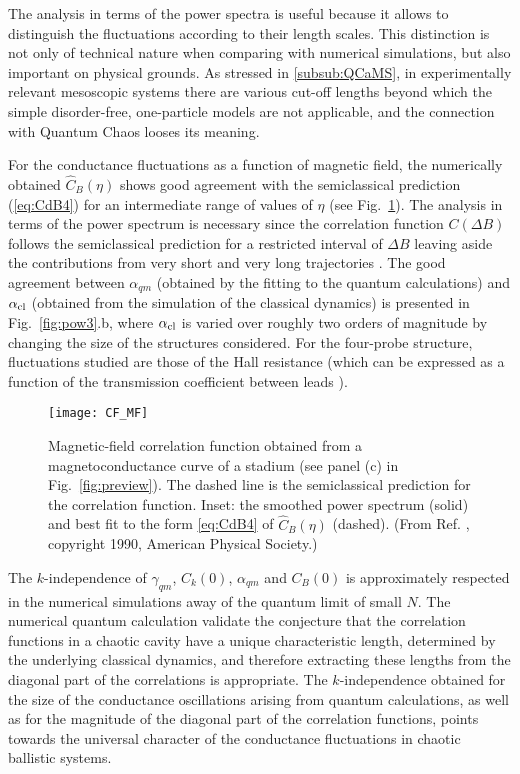 \documentclass[a4paper,10pt]{article}
\newcommand{\nin}{\noindent}
\newcommand{\alc}{\alpha_{\rm cl}}
\begin{document}
\nin The analysis in terms of the power spectra is useful because it allows to distinguish the fluctuations according to their length scales. This distinction is not only of technical nature when comparing with numerical simulations, but also important on physical grounds. As stressed in \ref{subsub:QCaMS}, in experimentally relevant mesoscopic systems there are various cut-off lengths beyond which the simple disorder-free, one-particle models are not applicable, and the connection with Quantum Chaos looses its meaning. 

\nin For the conductance fluctuations as a function of magnetic field, the numerically obtained $\widehat{C}_B(\eta)$ shows good agreement with the semiclassical prediction (\ref{eq:CdB4}) for an intermediate range of values of $\eta$ (see Fig.~\ref{fig:CF_MF}). The analysis in terms of the power spectrum is necessary since the correlation function $C(\Delta B)$ follows the semiclassical prediction for a restricted interval of 
$\Delta B$ leaving aside the contributions from very short and very long trajectories \cite{Jal90}. The good agreement between $\alpha_{qm}$ (obtained by the fitting to the  quantum calculations) and $\alc$ (obtained from the simulation of the classical dynamics) is presented in 
Fig.~\ref{fig:pow3}.b, where $\alc$ is varied over roughly two orders of magnitude by changing the size of the structures considered. For the 
four-probe structure, fluctuations studied are those of the Hall resistance (which can be expressed as a function of the transmission coefficient between leads \cite {Butt86,BvH88,Bar91}). 

\begin{figure}
\setlength{\unitlength}{1mm}
\centerline{\texttt{[image: CF\_MF]}}
\caption{
Magnetic-field correlation function obtained from a magnetoconductance curve of a stadium (see panel (c) in Fig.~\ref{fig:preview}). The dashed line is the semiclassical prediction for the correlation function. Inset: the smoothed power spectrum (solid) and best fit to the form \ref{eq:CdB4} of $\widehat{C}_B(\eta)$ (dashed). (From Ref. \protect\cite{Jal90}, copyright 1990, American Physical Society.)
}
\label{fig:CF_MF}
\end{figure}

\nin The $k$-independence of $\gamma_{qm}$, $C_k(0)$, $\alpha_{qm}$ and
$C_B(0)$ is approximately respected in the numerical simulations
away of the quantum limit of small $N$. The numerical quantum calculation validate the conjecture that the correlation functions in a chaotic cavity have a unique characteristic length, determined by the underlying classical dynamics, and therefore extracting these lengths from the diagonal part of the correlations is appropriate. The $k$-independence obtained for the size of the conductance oscillations arising from quantum calculations, as well as for the magnitude of the diagonal part of the correlation functions, points towards the universal character of the conductance fluctuations in chaotic ballistic systems. 
\end{document}
